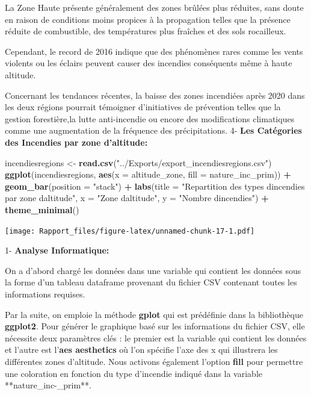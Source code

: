 \documentclass[
]{article}
\newenvironment{Shaded}{\begin{snugshade}}{\end{snugshade}}
\newcommand{\AttributeTok}[1]{\textcolor[rgb]{0.13,0.29,0.53}{#1}}
\newcommand{\FunctionTok}[1]{\textcolor[rgb]{0.13,0.29,0.53}{\textbf{#1}}}
\newcommand{\NormalTok}[1]{#1}
\newcommand{\OtherTok}[1]{\textcolor[rgb]{0.56,0.35,0.01}{#1}}
\newcommand{\SpecialCharTok}[1]{\textcolor[rgb]{0.81,0.36,0.00}{\textbf{#1}}}
\newcommand{\StringTok}[1]{\textcolor[rgb]{0.31,0.60,0.02}{#1}}
\begin{document}
La Zone Haute présente généralement des zones brûlées plus réduites,
sans doute en raison de conditions moins propices à la propagation
telles que la présence réduite de combustible, des températures plus
fraîches et des sols rocailleux.

Cependant, le record de 2016 indique que des phénomènes rares comme les
vents violents ou les éclairs peuvent causer des incendies conséquents
même à haute altitude.

Concernant les tendances récentes, la baisse des zones incendiées après
2020 dans les deux régions pourrait témoigner d'initiatives de
prévention telles que la gestion forestière,la lutte anti-incendie ou
encore des modifications climatiques comme une augmentation de la
fréquence des précipitations. 4- \textbf{Les Catégories des Incendies
par zone d'altitude:}

\begin{Shaded}
\begin{Highlighting}[]
\NormalTok{incendiesregions }\OtherTok{\textless{}{-}} \FunctionTok{read.csv}\NormalTok{(}\StringTok{"../Exports/export\_incendiesregions.csv"}\NormalTok{)}
\FunctionTok{ggplot}\NormalTok{(incendiesregions, }\FunctionTok{aes}\NormalTok{(}\AttributeTok{x =}\NormalTok{ altitude\_zone, }\AttributeTok{fill =}\NormalTok{ nature\_inc\_prim)) }\SpecialCharTok{+}
  \FunctionTok{geom\_bar}\NormalTok{(}\AttributeTok{position =} \StringTok{"stack"}\NormalTok{) }\SpecialCharTok{+}
  \FunctionTok{labs}\NormalTok{(}\AttributeTok{title =} \StringTok{"Repartition des types d\textquotesingle{}incendies par zone d\textquotesingle{}altitude"}\NormalTok{,}
       \AttributeTok{x =} \StringTok{"Zone d\textquotesingle{}altitude"}\NormalTok{, }\AttributeTok{y =} \StringTok{"Nombre d\textquotesingle{}incendies"}\NormalTok{) }\SpecialCharTok{+}
  \FunctionTok{theme\_minimal}\NormalTok{()}
\end{Highlighting}
\end{Shaded}

\texttt{[image: Rapport\_files/figure-latex/unnamed-chunk-17-1.pdf]}

1- \textbf{Analyse Informatique:}

On a d'abord chargé les données dans une variable qui contient les
données sous la forme d'un tableau dataframe provenant du fichier CSV
contenant toutes les informations requises.

Par la suite, on emploie la méthode \textbf{gplot} qui est prédéfinie
dans la bibliothèque \textbf{ggplot2}. Pour générer le graphique basé
sur les informations du fichier CSV, elle nécessite deux paramètres clés
: le premier est la variable qui contient les données et l'autre est
l'\textbf{aes aesthetics} où l'on spécifie l'axe des x qui illustrera
les différentes zones d'altitude. Nous activons également l'option
\textbf{fill} pour permettre une coloration en fonction du type
d'incendie indiqué dans la variable **nature\_inc-\_prim**.
\end{document}
